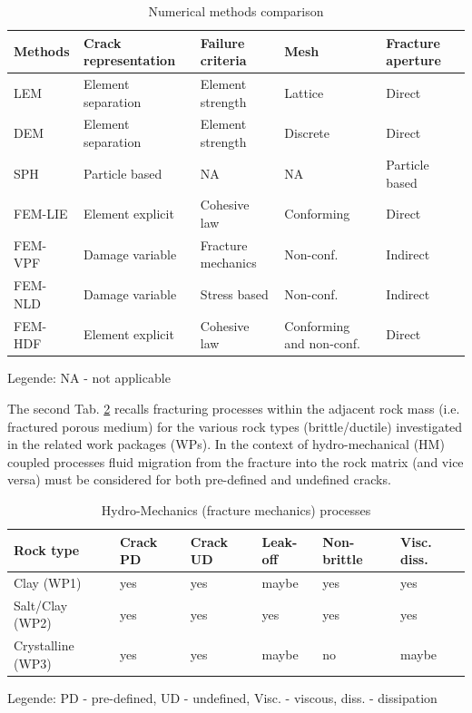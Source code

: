 \begin{table}[h!]
\centering
\caption{Numerical methods comparison}
\label{tab:num-comp}
\footnotesize
\begin{tabular}{lllll}
\hline
Methods & Crack representation & Failure criteria   & Mesh & Fracture aperture \\
\hline
LEM     & Element separation   & Element strength   & Lattice        & Direct \\
DEM     & Element separation   & Element strength   & Discrete       & Direct \\
SPH     & Particle based       & NA                 & NA             & Particle based \\
FEM-LIE & Element explicit     & Cohesive law       & Conforming     & Direct \\
FEM-VPF & Damage variable      & Fracture mechanics & Non-conf.      & Indirect \\
FEM-NLD & Damage variable      & Stress based       & Non-conf.      & Indirect \\
FEM-HDF & Element explicit     & Cohesive law       & Conforming and non-conf.  & Direct  \\
\hline
\end{tabular}
\end{table}
\vspace{-5mm}
\tiny Legende: NA - not applicable
\normalsize

The second Tab. \ref{tab:hm-processes} recalls fracturing processes within the adjacent rock mass (i.e. fractured porous medium) for the various rock types (brittle/ductile) investigated in the related work packages (WPs). In the context of hydro-mechanical (HM) coupled processes fluid migration from the fracture into the rock matrix (and vice versa) must be considered for both pre-defined and undefined cracks.

\clearpage

\begin{table}[h!]
\centering
\caption{Hydro-Mechanics (fracture mechanics) processes}
\label{tab:hm-processes}
\footnotesize
\begin{tabular}{llllll}
\hline
Rock type         & Crack PD & Crack UD & Leak-off & Non-brittle & Visc. diss.\\
\hline
Clay (WP1)        & yes & yes & maybe & yes & yes \\
Salt/Clay (WP2)   & yes & yes & yes   & yes & yes \\
Crystalline (WP3) & yes & yes & maybe & no  & maybe \\
\hline
\end{tabular}
\end{table}
\vspace{-5mm}
\tiny Legende: PD - pre-defined, UD - undefined, Visc. - viscous, diss. - dissipation
\normalsize

